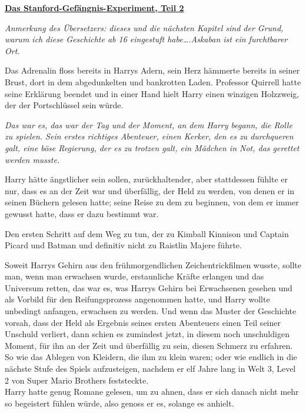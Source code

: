 

\hypertarget{das-stanford-gefuxe4ngnis-experiment-teil-2}{%

\textbf{\uline{Das Stanford-Gefängnis-Experiment, Teil 2}}

\emph{Anmerkung des Übersetzers: dieses und die nächsten Kapitel sind der Grund, warum ich diese Geschichte ab 16 eingestuft habe….Askaban ist ein furchtbarer Ort.}

Das Adrenalin floss bereits in Harrys Adern, sein Herz hämmerte bereits in seiner Brust, dort in dem abgedunkelten und bankrotten Laden. Professor Quirrell hatte seine Erklärung beendet und in einer Hand hielt Harry einen winzigen Holzzweig, der der Portschlüssel sein würde.

\emph{Das war es, das war der Tag und der Moment, an dem Harry begann, die Rolle zu spielen. Sein erstes richtiges Abenteuer, einen Kerker, den es zu durchqueren galt, eine böse Regierung, der es zu trotzen galt, ein Mädchen in Not, das gerettet werden musste.}

Harry hätte ängstlicher sein sollen, zurückhaltender, aber stattdessen fühlte er nur, dass es an der Zeit war und überfällig, der Held zu werden, von denen er in seinen Büchern gelesen hatte; seine Reise zu dem zu beginnen, von dem er immer gewusst hatte, dass er dazu bestimmt war.

Den ersten Schritt auf dem Weg zu tun, der zu Kimball Kinnison und Captain Picard und Batman und definitiv nicht zu Raistlin Majere führte.

Soweit Harrys Gehirn aus den frühmorgendlichen Zeichentrickfilmen wusste, sollte man, wenn man erwachsen wurde, erstaunliche Kräfte erlangen und das Universum retten, das war es, was Harrys Gehirn bei Erwachsenen gesehen und als Vorbild für den Reifungsprozess angenommen hatte, und Harry wollte unbedingt anfangen, erwachsen zu werden. Und wenn das Muster der Geschichte vorsah, dass der Held als Ergebnis seines ersten Abenteuers einen Teil seiner Unschuld verliert, dann schien es zumindest jetzt, in diesem noch unschuldigen Moment, für ihn an der Zeit und überfällig zu sein, diesen Schmerz zu erfahren. So wie das Ablegen von Kleidern, die ihm zu klein waren; oder wie endlich in die nächste Stufe des Spiels aufzusteigen, nachdem er elf Jahre lang in Welt 3, Level 2 von Super Mario Brothers feststeckte.\\ Harry hatte genug Romane gelesen, um zu ahnen, dass er sich danach nicht mehr so begeistert fühlen würde, also genoss er es, solange es anhielt.

}
